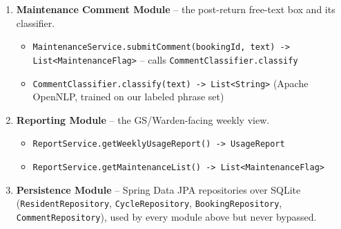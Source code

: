 \documentclass[11pt]{article}
\begin{document}
\begin{enumerate}[leftmargin=*]
\begin{itemize}[leftmargin=*]
    \item \texttt{TransactionService.confirmReturn(bookingId, passcode, conditionNote) -> CycleState}
  \end{itemize}
  \item \textbf{Maintenance Comment Module} -- the post-return free-text box and its classifier.
  \begin{itemize}[leftmargin=*]
    \item \texttt{MaintenanceService.submitComment(bookingId, text) -> List<MaintenanceFlag>} -- calls \texttt{CommentClassifier.classify}
    \item \texttt{CommentClassifier.classify(text) -> List<String>} (Apache OpenNLP, trained on our labeled phrase set)
  \end{itemize}
  \item \textbf{Reporting Module} -- the GS/Warden-facing weekly view.
  \begin{itemize}[leftmargin=*]
    \item \texttt{ReportService.getWeeklyUsageReport() -> UsageReport}
    \item \texttt{ReportService.getMaintenanceList() -> List<MaintenanceFlag>}
  \end{itemize}
  \item \textbf{Persistence Module} -- Spring Data JPA repositories over SQLite (\texttt{ResidentRepository}, \texttt{CycleRepository}, \texttt{BookingRepository}, \texttt{CommentRepository}), used by every module above but never bypassed.
\end{enumerate}
\end{document}
